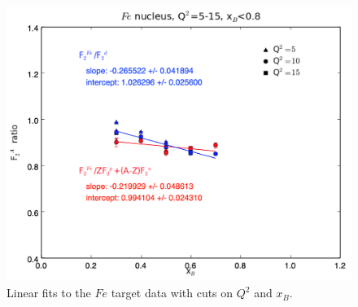\documentclass[oneside]{article}
\begin{document}
\begin{figure}[H]
\begin{minipage}{0.5\textwidth}
\includegraphics[width=\textwidth]{plots/q2_all_x_all/all_Fe.png}
\end{minipage}
  \caption[]{Linear fits to the $Fe$ target data with cuts on $Q^2$ and $x_B$.}
  \label{fig:fits_Fe}
\end{figure}   
\end{document}
